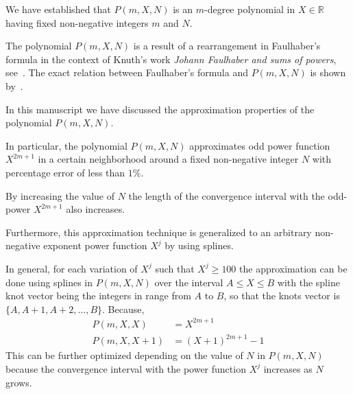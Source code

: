 We have established that $P(m, X, N)$ is an $m$-degree polynomial in $X\in\mathbb{R}$
having fixed non-negative integers $m$ and $N$.

The polynomial $P(m, X, N)$ is a result of a rearrangement in Faulhaber's formula
in the context of Knuth's work \textit{Johann Faulhaber and sums of powers}, see~\cite{knuth1993johann}.
The exact relation between Faulhaber's formula and $P(m,X,N)$ is shown by~\cite{kolosov2025unexpected}.

In this manuscript we have discussed the approximation properties of the polynomial $P(m,X,N)$.

In particular, the polynomial $P(m,X,N)$ approximates odd power function $X^{2m+1}$ in a certain neighborhood
around a fixed non-negative integer $N$ with percentage error of less than $1\%$.

By increasing the value of $N$ the length of the convergence interval with the odd-power $X^{2m+1}$ also increases.

Furthermore, this approximation technique is generalized to an arbitrary non-negative exponent power function $X^j$
by using splines.

In general, for each variation of $X^j$ such that $X^j \geq 100$ the approximation can be done using
splines in $P(m,X, N)$ over the interval $A \leq X \leq B$ with the spline knot vector being the integers in
range from $A$ to $B$, so that the knots vector is $\{A, A+1, A+2, \ldots, B \}$.
Because,
\begin{align*}
    P(m,X, X) &= X^{2m+1} \\
    P(m,X, X+1) &= (X+1)^{2m+1} - 1
\end{align*}
This can be further optimized depending on the value of $N$ in $P(m,X,N)$ because the convergence interval
with the power function $X^j$ increases as $N$ grows.
